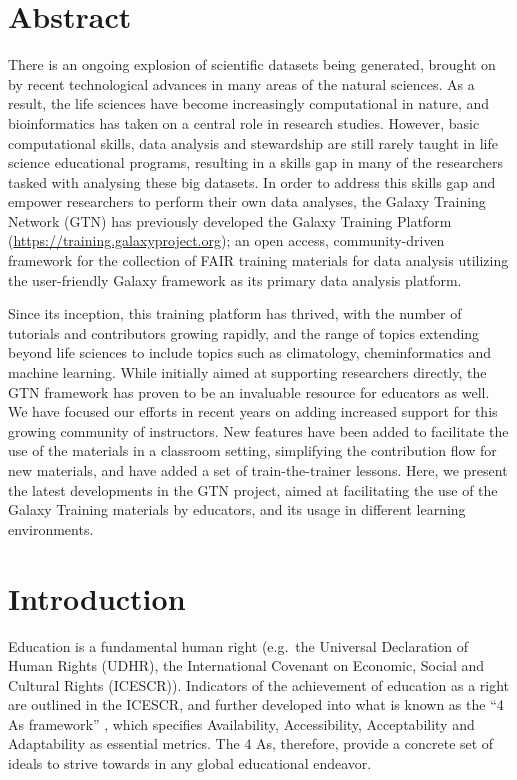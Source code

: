 \section*{Abstract}
There is an ongoing explosion of scientific datasets being generated, brought on by recent technological advances in many areas of the natural sciences.
As a result, the life sciences have become increasingly computational in nature, and bioinformatics has taken on a central role in research studies.
However, basic computational skills, data analysis and stewardship are still rarely taught in life science educational programs, resulting in a skills gap in many of the researchers tasked with analysing these big datasets.
In order to address this skills gap and empower researchers to perform their own data analyses, the Galaxy Training Network (GTN) has previously developed the Galaxy Training Platform (\url{https://training.galaxyproject.org}); an open access, community-driven framework for the collection of FAIR training materials for data analysis utilizing the user-friendly Galaxy framework as its primary data analysis platform.

Since its inception, this training platform has thrived, with the number of tutorials and contributors growing rapidly, and the range of topics extending beyond life sciences to include topics such as climatology, cheminformatics and machine learning.
While initially aimed at supporting researchers directly, the GTN framework has proven to be an invaluable resource for educators as well. We have focused our efforts in recent years on adding increased support for this growing community of instructors.
New features have been added to facilitate the use of the materials in a classroom setting, simplifying the contribution flow for new materials, and have added a set of train-the-trainer lessons.
Here, we present the latest developments in the GTN project, aimed at facilitating the use of the Galaxy Training materials by educators, and its usage in different learning environments.


\section*{Introduction}

Education is a fundamental human right (e.g.\ the Universal Declaration of Human Rights (UDHR), the International Covenant on Economic, Social and Cultural Rights (ICESCR)).
Indicators of the achievement of education as a right are outlined in the ICESCR, and further developed into what is known as the ``4 As framework'' \cite{tomavsevski2001human}, which specifies Availability, Accessibility, Acceptability and Adaptability as essential metrics.
The 4 As, therefore, provide a concrete set of ideals to strive towards in any global educational endeavor.

